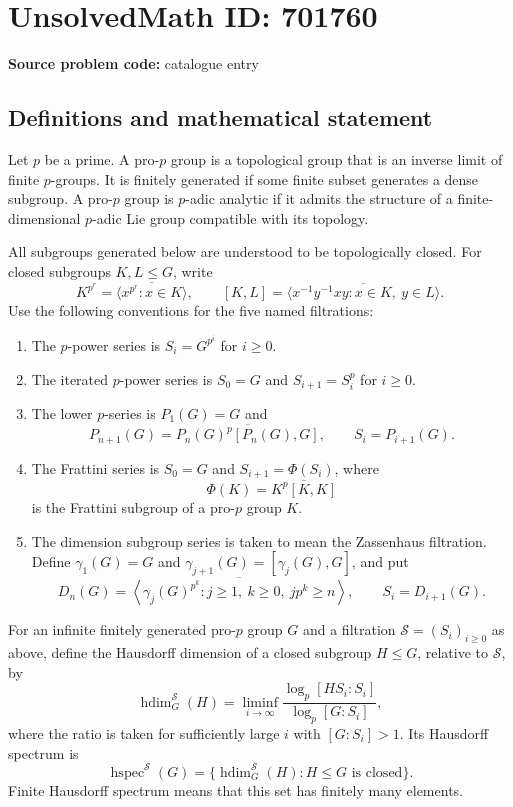 \documentclass[11pt]{article}
\begin{document}
\section*{UnsolvedMath ID: 701760}
\textbf{Source problem code:} catalogue entry
\subsection{Definitions and mathematical statement}
Let \(p\) be a prime. A pro-\(p\) group is a topological group that is an inverse limit of finite \(p\)-groups. It is finitely generated if some finite subset generates a dense subgroup. A pro-\(p\) group is \(p\)-adic analytic if it admits the structure of a finite-dimensional \(p\)-adic Lie group compatible with its topology.

All subgroups generated below are understood to be topologically closed. For closed subgroups \(K,L\leq G\), write
\[
K^{p^r}=\overline{\langle x^{p^r}:x\in K\rangle},\qquad
[K,L]=\overline{\langle x^{-1}y^{-1}xy:x\in K,\ y\in L\rangle}.
\]
Use the following conventions for the five named filtrations:
\begin{enumerate}
\item[(a)] The \(p\)-power series is \(S_i=G^{p^i}\) for \(i\geq0\).
\item[(b)] The iterated \(p\)-power series is \(S_0=G\) and \(S_{i+1}=S_i^p\) for \(i\geq0\).
\item[(c)] The lower \(p\)-series is \(P_1(G)=G\) and
\[
P_{n+1}(G)=\overline{P_n(G)^p[P_n(G),G]},\qquad S_i=P_{i+1}(G).
\]
\item[(d)] The Frattini series is \(S_0=G\) and \(S_{i+1}=\Phi(S_i)\), where
\[
\Phi(K)=\overline{K^p[K,K]}
\]
is the Frattini subgroup of a pro-\(p\) group \(K\).
\item[(e)] The dimension subgroup series is taken to mean the Zassenhaus filtration. Define \(\gamma_1(G)=G\) and \(\gamma_{j+1}(G)=[\gamma_j(G),G]\), and put
\[
D_n(G)=\overline{\left\langle \gamma_j(G)^{p^k}:j\geq1,\ k\geq0,\ jp^k\geq n\right\rangle},\qquad S_i=D_{i+1}(G).
\]
\end{enumerate}

For an infinite finitely generated pro-\(p\) group \(G\) and a filtration \(\mathcal S=(S_i)_{i\geq0}\) as above, define the Hausdorff dimension of a closed subgroup \(H\leq G\), relative to \(\mathcal S\), by
\[
\operatorname{hdim}^{\mathcal S}_G(H)
=\liminf_{i\to\infty}
\frac{\log_p[HS_i:S_i]}{\log_p[G:S_i]},
\]
where the ratio is taken for sufficiently large \(i\) with \([G:S_i]>1\). Its Hausdorff spectrum is
\[
\operatorname{hspec}^{\mathcal S}(G)
=\{\operatorname{hdim}^{\mathcal S}_G(H):H\leq G\text{ is closed}\}.
\]
Finite Hausdorff spectrum means that this set has finitely many elements.
\end{document}
